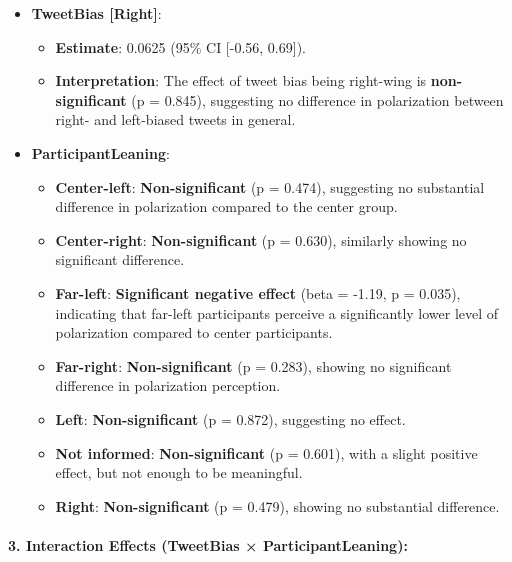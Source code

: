 \documentclass[
]{article}
\providecommand{\tightlist}{%
  \setlength{\itemsep}{0pt}\setlength{\parskip}{0pt}}
\begin{document}
\begin{itemize}
\tightlist
\item
  \textbf{TweetBias {[}Right{]}}:

  \begin{itemize}
  \tightlist
  \item
    \textbf{Estimate}: 0.0625 (95\% CI {[}-0.56, 0.69{]}).
  \item
    \textbf{Interpretation}: The effect of tweet bias being right-wing
    is \textbf{non-significant} (p = 0.845), suggesting no difference in
    polarization between right- and left-biased tweets in general.
  \end{itemize}
\item
  \textbf{ParticipantLeaning}:

  \begin{itemize}
  \tightlist
  \item
    \textbf{Center-left}: \textbf{Non-significant} (p = 0.474),
    suggesting no substantial difference in polarization compared to the
    center group.
  \item
    \textbf{Center-right}: \textbf{Non-significant} (p = 0.630),
    similarly showing no significant difference.
  \item
    \textbf{Far-left}: \textbf{Significant negative effect} (beta =
    -1.19, p = 0.035), indicating that far-left participants perceive a
    significantly lower level of polarization compared to center
    participants.
  \item
    \textbf{Far-right}: \textbf{Non-significant} (p = 0.283), showing no
    significant difference in polarization perception.
  \item
    \textbf{Left}: \textbf{Non-significant} (p = 0.872), suggesting no
    effect.
  \item
    \textbf{Not informed}: \textbf{Non-significant} (p = 0.601), with a
    slight positive effect, but not enough to be meaningful.
  \item
    \textbf{Right}: \textbf{Non-significant} (p = 0.479), showing no
    substantial difference.
  \end{itemize}
\end{itemize}

\paragraph{\texorpdfstring{\textbf{3. Interaction Effects (TweetBias ×
ParticipantLeaning)}:}{3. Interaction Effects (TweetBias × ParticipantLeaning):}}\label{interaction-effects-tweetbias-participantleaning}
\end{document}
